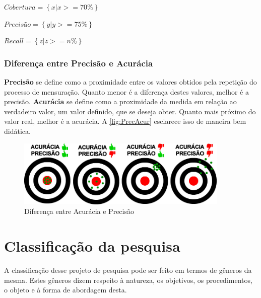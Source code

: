 \documentclass[
	12pt,				%
	openright,			%
	oneside,
	a4paper,			%
	english,			%
	french,				%
	spanish,			%
	brazil,				%
	]{abntex2}
\begin{document}
$Cobertura = \left \{ x | x >= 70\% \right \}$

$Precisão = \left \{ y | y >= 75\% \right \}$

$Recall = \left \{ z | z >= n\% \right \}$
\subsubsection{Diferença entre Precisão e Acurácia} \label{dif}

\textbf{Precisão} se define como a proximidade entre os valores obtidos pela repetição do processo de mensuração. Quanto menor é a diferença destes valores, melhor é a precisão. \textbf{Acurácia} se define como a proximidade da medida em relação ao verdadeiro valor, um valor definido, que se deseja obter. Quanto mais próximo do valor real, melhor é a acurácia. A \autoref{fig:PrecAcur} esclarece isso de maneira bem didática.

\begin{figure}
    \centering
    \includegraphics[width=0.9\textwidth]{Modelo_Projeto_Pesquisa_UFG_REJ_BCC/PrecisaoAcuracia.jpg}
    \caption{Diferença entre Acurácia e Precisão}
    \label{fig:PrecAcur}
\end{figure}


\section{Classificação da pesquisa}
\label{sec:classif}
A classificação desse projeto de pesquisa pode ser feito em termos de gêneros da mesma. Estes gêneros dizem respeito à natureza, os objetivos, os procedimentos, o objeto e à forma de abordagem desta.
\end{document}
